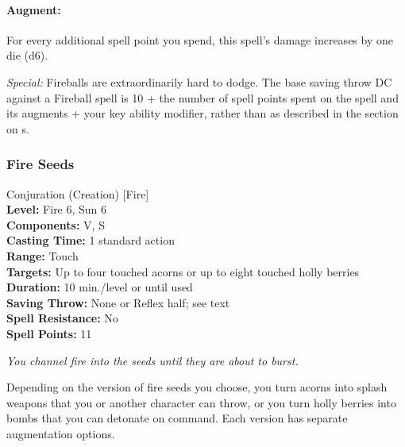 \paragraph{Augment:} For every additional spell point you spend, this spell's damage increases by one die (d6).

\emph{Special:} Fireballs are extraordinarily hard to dodge. The base saving throw DC against a Fireball spell is 
10 + the number of spell points spent on the spell and its augments + your key ability modifier, 
rather than as described in the section on s.
\subsubsection{Fire Seeds}
\label{Spell:FireSeeds}
Conjuration (Creation) [Fire]
\\ \textbf{Level:} Fire 6, Sun 6
\\ \textbf{Components:} V, S
\\ \textbf{Casting Time:} 1 standard action
\\ \textbf{Range:} Touch
\\ \textbf{Targets:} Up to four touched acorns or up to eight touched holly berries
\\ \textbf{Duration:} 10 min./level or until used
\\ \textbf{Saving Throw:} None or Reflex half; see text
\\ \textbf{Spell Resistance:} No
\\ \textbf{Spell Points:} 11

\emph{You channel fire into the seeds until they are about to burst.}

Depending on the version of fire seeds you choose, you turn acorns into splash weapons that you or another character can throw, or you turn holly berries into bombs that you can detonate on command. Each version has separate augmentation options.

